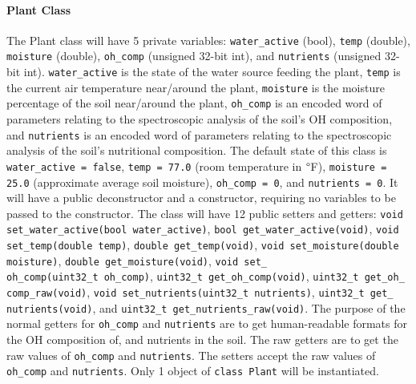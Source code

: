 \paragraph{Plant Class}
The Plant class will have 5 private variables: \texttt{water\_active} (bool),
\texttt{temp} (double), \texttt{moisture} (double), \texttt{oh\_comp}
(unsigned 32-bit int), and \texttt{nutrients} (unsigned 32-bit int).
\texttt{water\_active} is the state of the water source feeding the plant,
\texttt{temp} is the current air temperature near/around the plant,
\texttt{moisture} is the moisture percentage of the soil near/around the plant,
\texttt{oh\_comp} is an encoded word of parameters relating to the
spectroscopic analysis of the soil's OH composition, and
\texttt{nutrients} is an encoded word of parameters relating to the
spectroscopic analysis of the soil's nutritional composition. The
default state of this class is \texttt{water\_active = false},
\texttt{temp = 77.0} (room temperature in $\degree$F), \texttt{moisture = 25.0}
(approximate average soil moisture), \texttt{oh\_comp = 0}, and
\texttt{nutrients = 0}. It will have a public deconstructor and a constructor,
requiring no variables to be passed to the constructor. The class will have 12
public setters and getters:
\texttt{void set\_water\_active(bool water\_active)}, 
\texttt{bool get\_water\_active(void)}, 
\texttt{void set\_temp(double temp)}, \texttt{double get\_temp(void)}, 
\texttt{void set\_moisture(double moisture)}, 
\texttt{double get\_moisture(void)}, 
\texttt{void set\_\\
oh\_comp(uint32\_t oh\_comp)}, 
\texttt{uint32\_t get\_oh\_comp(void)},
\texttt{uint32\_t get\_oh\_\\
comp\_raw(void)}, 
\texttt{void set\_nutrients(uint32\_t nutrients)}, 
\texttt{uint32\_t get\_\\
nutrients(void)}, and
\texttt{uint32\_t get\_nutrients\_raw(void)}. The purpose of the normal getters
for \texttt{oh\_comp} and \texttt{nutrients} are to get human-readable formats
for the OH composition of, and nutrients in the soil. The raw getters are to
get the raw values of \texttt{oh\_comp} and \texttt{nutrients}. The setters
accept the raw values of \texttt{oh\_comp} and \texttt{nutrients}. Only 
1 object of \texttt{class Plant} will be instantiated.

